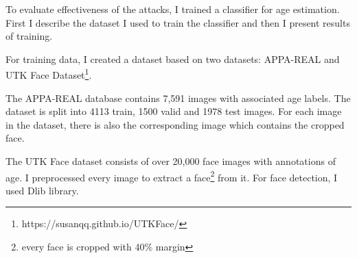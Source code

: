 To evaluate effectiveness of the attacks, I trained a classifier for age estimation. 
First I describe the dataset I used to train the classifier and then I present results of training. 

For training data, I created a dataset based on two datasets: APPA-REAL \cite{agustsson2017appareal} and UTK Face Dataset\footnote{https://susanqq.github.io/UTKFace/}.

The APPA-REAL database contains 7,591 images with associated age labels. The dataset is split into 4113 train, 1500 valid and 1978 test images. For each image in the dataset, there is also the corresponding image which contains the cropped face.

The UTK Face dataset consists of over 20,000 face images with annotations of age. I preprocessed every image to extract a face\footnote{every face is cropped with 40\% margin} from it. For face detection, I used Dlib \cite{dlib09} library.


